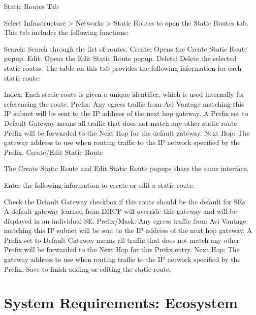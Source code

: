 \documentclass[letterpaper,10pt,english]{sphinxmanual}
\begin{document}
Static Routes Tab

Select Infrastructure \textgreater{} Networks \textgreater{} Static Routes to open the Static Routes tab. This tab includes the following functions:

Search: Search through the list of routes.
Create: Opens the Create Static Route popup.
Edit: Opens the Edit Static Route popup.
Delete: Delete the selected static routes.
The table on this tab provides the following information for each static route:

Index: Each static route is given a unique identifier, which is used internally for referencing the route.
Prefix: Any egress traffic from Avi Vantage matching this IP subnet will be sent to the IP address of the next hop gateway. A Prefix set to Default Gateway means all traffic that does not match any other static route Prefix will be forwarded to the Next Hop for the default gateway.
Next Hop: The gateway address to use when routing traffic to the IP network specified by the Prefix.
Create/Edit Static Route

The Create Static Route and Edit Static Route popups share the same interface.

Enter the following information to create or edit a static route:

Check the Default Gateway checkbox if this route should be the default for SEs. A default gateway learned from DHCP will override this gateway and will be displayed in an individual SE.
Prefix/Mask: Any egress traffic from Avi Vantage matching this IP subnet will be sent to the IP address of the next hop gateway. A Prefix set to Default Gateway means all traffic that does not match any other Prefix will be forwarded to the Next Hop for this Prefix entry.
Next Hop: The gateway address to use when routing traffic to the IP network specified by the Prefix.
Save to finish adding or editing the static route.


\section{System Requirements: Ecosystem}
\label{\detokenize{getting_started/requirements_ecosystem:system-requirements-ecosystem}}\label{\detokenize{getting_started/requirements_ecosystem::doc}}
\end{document}
